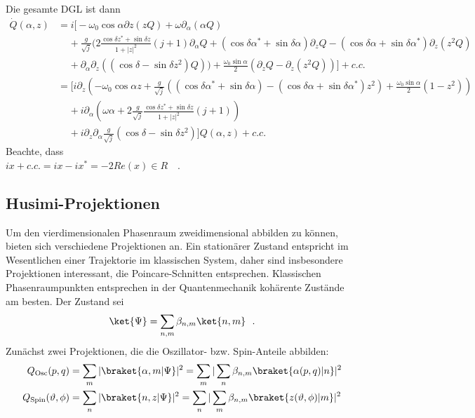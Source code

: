 Die gesamte DGL ist dann
\begin{align*}
  \dot Q (\alpha,z) &= i \Bigg[ -\omega_0\cos\alpha \partial z(zQ) + \omega \partial_\alpha (\alpha Q) \\
 &~~~~~+\frac{g}{\sqrt{j}} \Bigg( 2\frac{\cos\delta z^* + \sin\delta z}{1+|z|^2}(j+1)\partial_\alpha Q + (\cos\delta \alpha^* + \sin\delta\alpha)\partial_zQ -(\cos\delta\alpha + \sin\delta\alpha^*)\partial_z(z^2Q)\\
  &~~~~~+\partial_\alpha \partial_z ((\cos\delta-\sin\delta z^2)Q)\Bigg) + \frac{\omega_0\sin\alpha}{2} (\partial_z Q -\partial_z(z^2Q))\Bigg] +c.c.\\
  &= \Bigg[i\partial_z \left(-\omega_0\cos\alpha z + \frac{g}{\sqrt{j}}\left( (\cos\delta\alpha^* + \sin\delta\alpha)-(\cos\delta\alpha + \sin\delta\alpha^*)z^2\right) + \frac{\omega_0\sin\alpha}{2} (1-z^2)\right)\\
  &~~~~~+ i\partial_\alpha \left( \omega \alpha + 2 \frac{g}{\sqrt{j}} \frac{\cos\delta z^* + \sin\delta z}{1+|z|^2} (j+1) \right)\\
  &~~~~~+ i \partial_z \partial_\alpha \frac{g}{\sqrt{j}} \left(\cos\delta - \sin\delta z^2\right)\Bigg] Q (\alpha,z) + c.c.
\end{align*}
Beachte, dass\\ $ix + c.c. = ix  -ix^* = -2Re(x) \in R$~~.

\subsection{Husimi-Projektionen}
Um den vierdimensionalen Phasenraum zweidimensional abbilden zu können, bieten sich verschiedene Projektionen an.
Ein stationärer Zustand entspricht im Wesentlichen einer Trajektorie im klassischen System, daher sind insbesondere Projektionen interessant, die Poincare-Schnitten entsprechen.
Klassischen Phasenraumpunkten entsprechen in der Quantenmechanik kohärente Zustände am besten.
Der Zustand sei
\begin{align}
  \ket{\Psi} = \sum\limits_{n,m} \beta_{n,m} \ket{n,m}~~.
\end{align}
Zunächst zwei Projektionen, die die Oszillator- bzw. Spin-Anteile abbilden:
\begin{align}
  Q_\text{Osc} (p,q)&= \sum\limits_m|\braket{\alpha,m|\Psi}|^2 = \sum\limits_m|\sum\limits_n \beta_{n,m} \braket{\alpha(p,q)|n}|^2\\
  Q_\text{Spin} (\vartheta,\phi)&= \sum\limits_n|\braket{n,z|\Psi}|^2 = \sum\limits_n|\sum\limits_m \beta_{n,m} \braket{z(\vartheta,\phi)|m}|^2
\end{align}


